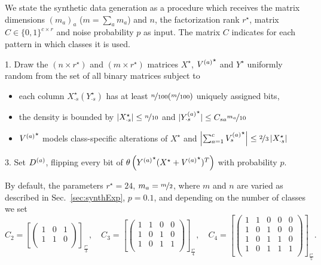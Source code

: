 We state the synthetic data generation as a procedure which receives the matrix dimensions $(m_a)_a$ ($m=\sum_am_a$) and $n$, the factorization rank $r^\star$, matrix $C\in\{0,1\}^{c\times r}$ and noise probability $p$ as input. The matrix $C$ indicates for each pattern in which classes it is used.
\begin{description}
\item [\textbf{GenerateData}($n,(m_a)_a,r^\star,C,p$)]
\item 1. Draw the $(n\times r^\star)$ and $(m\times r^\star)$ matrices $X^\star$, ${V^{(a)}}^\star$ and $Y^\star$ uniformly random from the set of all  binary matrices subject to
\begin{itemize}
	\item each column $X^\star_{\cdot s} (Y^\star_{\cdot s})$ has at least $\nicefrac{n}{100}(\nicefrac{m}{100})$ uniquely assigned bits,
	\item the density is bounded by $|X^\star_{\cdot s}|\leq \nicefrac{n}{10}$ and $|{Y^{(a)}_{\cdot s}}^\star|\leq C_{sa}\nicefrac{m_a}{10}$
	\item ${V^{(a)}}^\star$ models class-specific alterations of $X^\star$ and
$\left|\sum_{a=1}^c{V^{(a)}_{s}}^\star\right|\leq \nicefrac{2}{3} \left|X^\star_{\cdot s}\right|$
\end{itemize}
\item 3. Set $D^{(a)}$, flipping every bit of $\theta\left({Y^{(a)}}^\star (X^\star+{V^{(a)}}^\star)^T\right)$ with probability $p$.
\end{description}
By default, the parameters $r^\star=24$, $m_a=\nicefrac{m}{2}$, where $m$ and $n$ are varied as described in Sec.~\ref{sec:synthExp}, $p=0.1$, and depending on the number of classes we set
\[C_2=\left[
\begin{pmatrix}
1 & 0 & 1\\
1 & 1 & 0\\
\end{pmatrix}\right]_{\frac{r^\star}{3}},\quad C_3=\left[\begin{pmatrix}
1 & 1 & 0 & 0\\
1 & 0 & 1 & 0\\
1& 0 & 1 & 1\\
\end{pmatrix}\right]_{\frac{r^\star}{4}},\quad
C_4=\left[\begin{pmatrix}
1 & 1 & 0 & 0 & 0\\
1 & 0 & 1 & 0 & 0\\
1 & 0 & 1 & 1 & 0\\
1 & 0 & 1 & 1 & 1\\
\end{pmatrix}\right]_{\frac{r^\star}{5}} .\]
